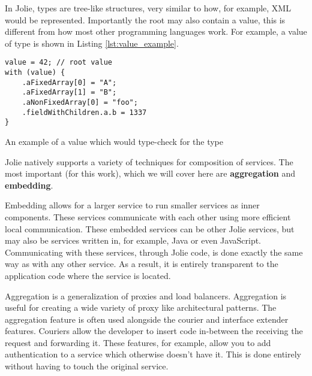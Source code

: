 In Jolie, types are tree-like structures, very similar to how, for example, XML
would be represented. Importantly the root may also contain a value, this is
different from how most other programming languages work. For example, a value
of type  is shown in Listing \ref{lst:value_example}.

\begin{listing}[H]
\begin{verbatim}
value = 42; // root value
with (value) {
    .aFixedArray[0] = "A";
    .aFixedArray[1] = "B";
    .aNonFixedArray[0] = "foo";
    .fieldWithChildren.a.b = 1337
}
\end{verbatim}

\caption{An example of a value which would type-check for the type
    }

\label{lst:value_example}
\end{listing}

Jolie natively supports a variety of techniques for composition of services.
The most important (for this work), which we will cover here are
\textbf{aggregation} and \textbf{embedding}.

Embedding allows for a larger service to run smaller services as inner
components. These services communicate with each other using more efficient
local communication. These embedded services can be other Jolie services, but
may also be services written in, for example, Java or even JavaScript.
Communicating with these services, through Jolie code, is done exactly the same
way as with any other service. As a result, it is entirely transparent to the
application code where the service is located.

Aggregation is a generalization of proxies and load balancers. Aggregation is
useful for creating a wide variety of proxy like architectural patterns. The
aggregation feature is often used alongside the courier and interface extender
features. Couriers allow the developer to insert code in-between the receiving
the request and forwarding it. These features, for example, allow you to add
authentication to a service which otherwise doesn't have it. This is done
entirely without having to touch the original service.
